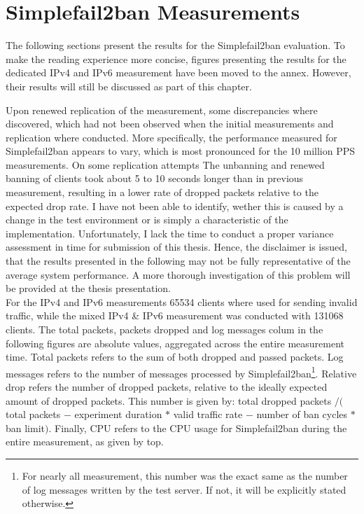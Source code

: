\section{Simplefail2ban Measurements}

The following sections present the results for the Simplefail2ban evaluation. To make the reading experience more concise, figures presenting the results 
for the dedicated \ac{IPv4} and \ac{IPv6} measurement have been moved to the annex. However, their results will still be discussed as part of this chapter.

Upon renewed replication of the measurement, some discrepancies where discovered, which had not been observed when the initial measurements and replication where conducted.
More specifically, the performance measured for Simplefail2ban appears to vary, which is most pronounced for the 10 million \ac{PPS} measurements. On some replication attempts
The unbanning and renewed banning of clients took about 5 to 10 seconds longer than in previous measurement, resulting in a lower rate of dropped packets relative to the expected drop rate.
I have not been able to identify, wether this is caused by a change in the test environment or is simply a characteristic of the implementation. Unfortunately, I lack the time
to conduct a proper variance assessment in time for submission of this thesis. Hence, the disclaimer is issued, that the results presented in the following may not be fully
representative of the average system performance. A more thorough investigation of this problem will be provided at the thesis presentation. \\ 

For the \ac{IPv4} and \ac{IPv6} measurements 65534 clients where used for sending invalid traffic,
while the mixed \ac{IPv4} \& \ac{IPv6} measurement was conducted with 131068 clients. The total packets, packets dropped and
log messages colum in the following figures are absolute values, aggregated across the entire measurement time. Total packets refers to the sum of both dropped and passed packets. Log messages refers to the number of messages processed by Simplefail2ban\footnote{For nearly all measurement, this number was the exact same as the number of log messages written by the test server. If not, it will be explicitly stated otherwise.}.
Relative drop refers the number of dropped packets, relative to the ideally expected amount of dropped packets. This number is given by: total dropped packets $/ ($total packets $-$ experiment duration $*$ valid traffic rate $-$ number of ban cycles $*$ ban limit$)$. Finally, \ac{CPU} refers to the \ac{CPU} usage for Simplefail2ban
during the entire measurement, as given by top. 

